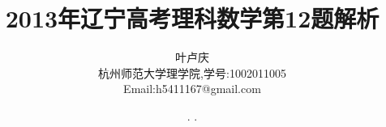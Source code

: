 \documentclass[a4paper, 12pt]{article} %
\makeatletter
\renewcommand{\maketitle}{ %
  \renewcommand\refname{参考文献}
  \newcommand{\D}{\displaystyle}\newcommand{\ri}{\Rightarrow}
  \newcommand{\ds}{\displaystyle} \renewcommand{\ni}{\noindent}
  \newcommand{\pa}{\partial} \newcommand{\Om}{\Omega}
  \newcommand{\om}{\omega} \newcommand{\sik}{\sum_{i=1}^k}
  \newcommand{\vov}{\Vert\omega\Vert} \newcommand{\Umy}{U_{\mu_i,y^i}}
  \newcommand{\lamns}{\lambda_n^{^{\scriptstyle\sigma}}}
  \newcommand{\chiomn}{\chi_{_{\Omega_n}}}
  \newcommand{\ullim}{\underline{\lim}} \newcommand{\bsy}{\boldsymbol}
  \newcommand{\mvb}{\mathversion{bold}} \newcommand{\la}{\lambda}
  \newcommand{\La}{\Lambda} \newcommand{\va}{\varepsilon}
  \newcommand{\be}{\beta} \newcommand{\al}{\alpha}
  \newcommand{\dis}{\displaystyle} \newcommand{\R}{{\mathbb R}}
  \newcommand{\N}{{\mathbb N}} \newcommand{\cF}{{\mathcal F}}
  \newcommand{\gB}{{\mathfrak B}} \newcommand{\eps}{\epsilon}
  \begin{flushright} %
    {\LARGE\@title} %
    
    \vspace{50pt} %
    
    {\large\@author} %
    \\\@date %
    
    \vspace{40pt} %
  \end{flushright}
}
\makeatother
\begin{document}
\begin{CJK}{UTF8}{gkai}
  \title{\textbf{2013年辽宁高考理科数学第12题解析}} 
  \author{\small{叶卢庆}\\{\small{杭州师范大学理学院,学号:1002011005}}\\{\small{Email:h5411167@gmail.com}}} %
  \renewcommand{\today}{\number\year. \number\month. \number\day}
  \date{\today} %
  
  
  
  \maketitle %
  
  
  
  
  
  
  

\end{CJK}
\end{document}
